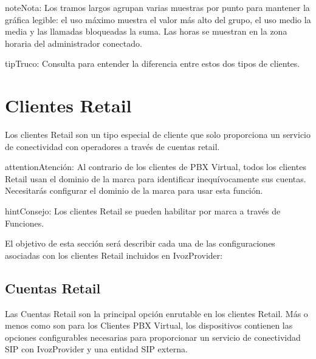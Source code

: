 \documentclass[letterpaper,10pt,spanish]{sphinxmanual}
\begin{document}
\begin{notice}{note}{Nota:}
Los tramos largos agrupan varias muestras por punto para mantener la gráfica legible: el uso máximo muestra el valor más alto del grupo, el uso medio la media y las llamadas bloqueadas la suma. Las horas se muestran en la zona horaria del administrador conectado.
\end{notice}

\begin{notice}{tip}{Truco:}
Consulta {\hyperref[administration_portal/brand/clients/retail:differences\string-between\string-retail\string-and\string-residential\string-clients]{}} para entender la diferencia entre estos dos tipos de clientes.
\end{notice}
\label{administration_portal/client/retail/index:retail-clients}

\section{Clientes Retail}
\label{administration_portal/client/retail/index:retail-clients}\label{administration_portal/client/retail/index:clientes-retail}\label{administration_portal/client/retail/index::doc}\label{administration_portal/client/retail/index:id1}
Los clientes Retail son un tipo especial de cliente que solo proporciona un servicio de conectividad con operadores a través de cuentas retail.

\begin{notice}{attention}{Atención:}
Al contrario de los clientes de PBX Virtual, todos los clientes Retail usan el dominio de la marca para identificar inequívocamente sus cuentas. Necesitarás configurar el dominio de la marca para usar esta función.
\end{notice}

\begin{notice}{hint}{Consejo:}
Los clientes Retail se pueden habilitar por marca a través de Funciones.
\end{notice}

El objetivo de esta sección será describir cada una de las configuraciones asociadas con los clientes Retail incluidos en IvozProvider:


\subsection{Cuentas Retail}
\label{administration_portal/client/retail/retail_accounts::doc}\label{administration_portal/client/retail/retail_accounts:retail-accounts}\label{administration_portal/client/retail/retail_accounts:id1}
Las Cuentas Retail son la principal opción enrutable en los clientes Retail. Más o menos como {\hyperref[administration_portal/client/vpbx/routing_endpoints/friends/index:friends]{}} son para los Clientes PBX Virtual, los dispositivos contienen las opciones configurables necesarias para proporcionar un servicio de conectividad SIP con IvozProvider y una entidad SIP externa.
\end{document}
